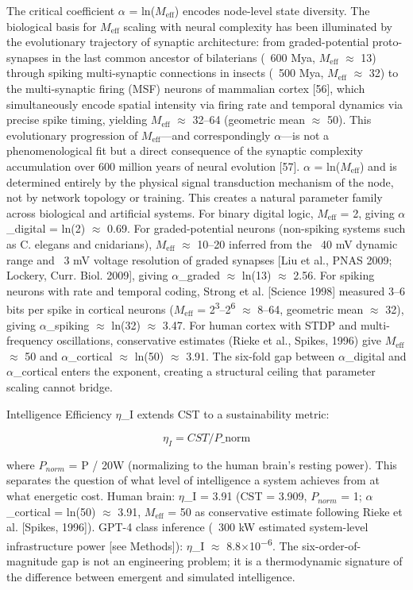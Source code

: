 \documentclass[a4paper,12pt]{article}
\begin{document}
The critical coefficient $\alpha$ = ln($M_{\text{eff}}$) encodes node-level state diversity.
The biological basis for $M_{\text{eff}}$ scaling with neural complexity has been illuminated by the evolutionary trajectory of synaptic architecture: from graded-potential proto-synapses in the last common ancestor of bilaterians (~600 Mya, $M_{\text{eff}}$ $\approx$ 13) through spiking multi-synaptic connections in insects (~500 Mya, $M_{\text{eff}}$ $\approx$ 32) to the multi-synaptic firing
(MSF) neurons of mammalian cortex [56], which simultaneously encode spatial intensity via firing rate and temporal dynamics via precise spike timing, yielding $M_{\text{eff}}$ $\approx$ 32--64 (geometric mean $\approx$ 50).
This evolutionary progression of $M_{\text{eff}}$---and correspondingly $\alpha$---is not a phenomenological fit but a direct consequence of the synaptic complexity accumulation over 600 million years of neural evolution [57]. $\alpha$ = ln($M_{\text{eff}}$) and is determined entirely by the physical signal transduction mechanism of the node, not by network topology or training.
This creates a natural parameter family across biological and artificial systems.
For binary digital logic, $M_{\text{eff}}$ = 2, giving $\alpha$_digital = ln(2) $\approx$ 0.69.
For graded-potential neurons (non-spiking systems such as C. elegans and cnidarians), $M_{\text{eff}}$ $\approx$ 10--20 inferred from the ~40 mV dynamic range and ~3 mV voltage resolution of graded synapses [Liu et al., PNAS 2009; Lockery, Curr.
Biol. 2009], giving $\alpha$_graded $\approx$ ln(13) $\approx$ 2.56.
For spiking neurons with rate and temporal coding, Strong et al. [Science 1998] measured 3--6 bits per spike in cortical neurons ($M_{\text{eff}}$ = 2\textsuperscript{3}--2\textsuperscript{6} $\approx$ 8--64, geometric mean $\approx$ 32), giving $\alpha$_spiking $\approx$ ln(32) $\approx$ 3.47.
For human cortex with STDP and multi-frequency oscillations, conservative estimates (Rieke et al., Spikes, 1996) give $M_{\text{eff}}$ $\approx$ 50 and $\alpha$_cortical $\approx$ ln(50) $\approx$ 3.91.
The six-fold gap between $\alpha$_digital and $\alpha$_cortical enters the exponent, creating a structural ceiling that parameter scaling cannot bridge.


Intelligence Efficiency $\eta$_I extends CST to a sustainability metric:


\begin{equation}
\eta_I = CST / P\_{\text{norm}} \tag{5}
\end{equation}


where $P_{norm}$ = P / 20W (normalizing to the human brain's resting power).
This separates the question of what level of intelligence a system achieves from at what energetic cost.
Human brain: $\eta$_I = 3.91 (CST = 3.909, $P_{norm}$ = 1; $\alpha$_cortical = ln(50) $\approx$ 3.91, $M_{\text{eff}}$ = 50 as conservative estimate following Rieke et al. [Spikes, 1996]).
GPT-4 class inference (~300 kW estimated system-level infrastructure power [see Methods]): $\eta$_I $\approx$ 8.8$\times$10\textsuperscript{$-$}\textsuperscript{6}.
The six-order-of-magnitude gap is not an engineering problem; it is a thermodynamic signature of the difference between emergent and simulated intelligence.
\end{document}
